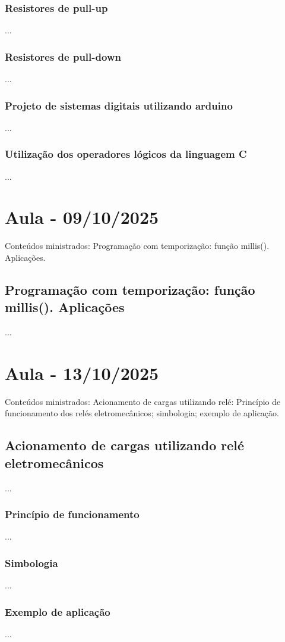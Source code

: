 \documentclass{article}
\begin{document}
\subsubsection{Resistores de pull-up}
...

\subsubsection{Resistores de pull-down}
...

\subsubsection{Projeto de sistemas digitais utilizando arduino}
...

\subsubsection{Utilização dos operadores lógicos da linguagem C}
...


\section{Aula - 09/10/2025}
Conteúdos ministrados: Programação com temporização: função millis(). Aplicações.

\subsection{Programação com temporização: função millis(). Aplicações}
...

\section{Aula - 13/10/2025}
Conteúdos ministrados: Acionamento de cargas utilizando relé: Princípio de funcionamento dos relés eletromecânicos; simbologia; exemplo de aplicação.

\subsection{Acionamento de cargas utilizando relé eletromecânicos}
...

\subsubsection{Princípio de funcionamento}
...

\subsubsection{Simbologia}
...

\subsubsection{Exemplo de aplicação}
...



\end{document}
